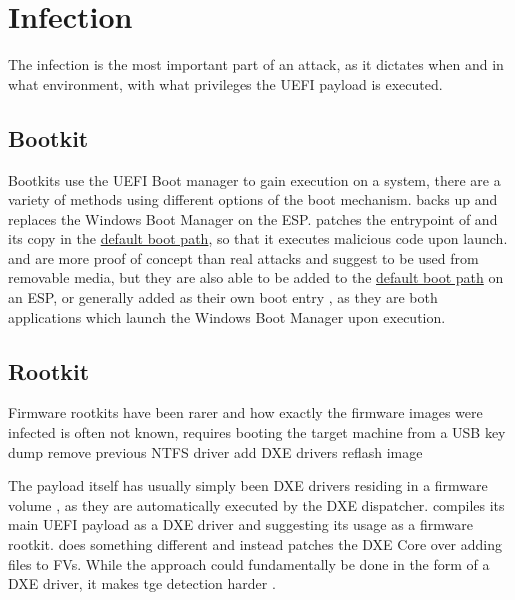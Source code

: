 \section{Infection}

The infection is the most important part of an attack, as it dictates when and in what environment, with what privileges the \ac{UEFI} payload is executed.

\subsection{Bootkit}

Bootkits use the \ac{UEFI} Boot manager to gain execution on a system, there are a variety of methods using different options of the boot mechanism.
\cite{finspy} backs up and replaces the Windows Boot Manager  on the \ac{ESP}.
\cite{especter} patches the entrypoint of  and its copy  in the \hyperref[sec:uefi-pi:uefi:boot-manager]{default boot path}, so that it executes malicious code upon launch.
\cite{dreamboot} and \cite{efiguard} are more proof of concept than real attacks and suggest to be used from removable media, but they are also able to be added to the \hyperref[sec:uefi-pi:uefi:boot-manager]{default boot path} on an \ac{ESP}, or generally added as their own boot entry \cite{efiguard}, as they are both applications which launch the Windows Boot Manager upon execution.

\subsection{Rootkit}

Firmware rootkits have been rarer and how exactly the firmware images were infected is often not known,
\cite{vector-edk} requires booting the target machine from a USB key \cite{mosaicregressor}
 \cite{lojax}
dump
remove previous NTFS driver
add DXE drivers
reflash image

The payload itself has usually simply been \ac{DXE} drivers residing in a firmware volume \cite{mosaicregressor,lojax}, as they are automatically executed by the \ac{DXE} dispatcher. \cite{efiguard} compiles its main \ac{UEFI} payload as a \ac{DXE} driver and suggesting its usage as a firmware rootkit. \cite{moonbounce} does something different and instead patches the \ac{DXE} Core over adding files to \acp{FV}. While the approach could fundamentally be done in the form of a \ac{DXE} driver, it makes tge detection harder \cite{moonbounce}.

